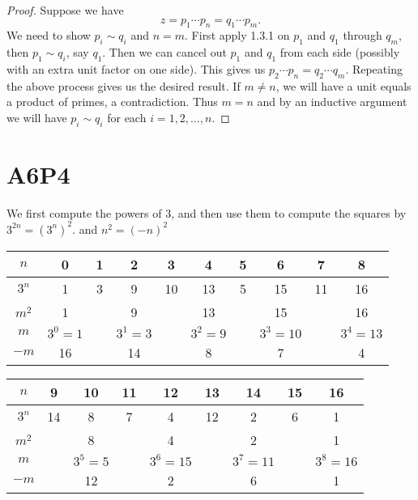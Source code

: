 \documentclass{article}
\begin{document}
\begin{proof}
Suppose we have
$$z = p_1\cdots p_n = q_1\cdots p_m.$$
We need to show $p_i \sim q_i$ and $n =m$. First apply  1.3.1 on $p_1$ and $q_1$ through $q_m$, then $p_1 \sim q_i$, say $q_1$. Then we can cancel out $p_1$ and $q_1$ from each side (possibly with an extra unit factor on one side). This gives us $p_2\cdots p_n=q_2\cdots q_m$. Repeating the above process gives us the desired result. If $m \neq n$, we will have a unit equals a product of primes, a contradiction. Thus $m =n$ and by an inductive argument we will have $p_i \sim q_i$ for each $i = 1, 2, \ldots, n.$
\end{proof}

\pagebreak
\section{A6P4}
We first compute the powers of 3, and then use them to compute the squares by $3^{2n}=(3^n)^2.$ and $n^2=(-n)^2$
\begin{table}[h]
\begin{tabular}{|c|c|c|c|c|c|c|c|c|c|}
\hline
$n$   & 0       & 1 & 2       & 3  & 4       & 5 & 6        & 7  & 8        \\ \hline
$3^n$ & 1       & 3 & 9       & 10 & 13      & 5 & 15       & 11 & 16       \\ \hline
$m^2$ & 1       &   & 9       &    & 13      &   & 15       &    & 16       \\ \hline
$m$   & $3^0=1$ &   & $3^1=3$ &    & $3^2=9$ &   & $3^3=10$ &    & $3^4=13$ \\ \hline
$-m$  & 16      &   & 14      &    & 8       &   & 7        &    & 4        \\ \hline
\end{tabular}
\end{table}

\begin{table}[h]
\begin{tabular}{|c|c|c|c|c|c|c|c|c|}
\hline
$n$   & 9  & 10      & 11 & 12       & 13 & 14       & 15 & 16       \\ \hline
$3^n$ & 14 & 8       & 7  & 4        & 12 & 2        & 6  & 1        \\ \hline
$m^2$ &    & 8       &    & 4        &    & 2        &    & 1        \\ \hline
$m$   &    & $3^5=5$ &    & $3^6=15$ &    & $3^7=11$ &    & $3^8=16$ \\ \hline
$-m$  &    & 12      &    & 2        &    & 6        &    & 1        \\ \hline
\end{tabular}
\end{table}
\def\lc{\left\lceil}   
\def\rc{\right\rceil}
\end{document}
